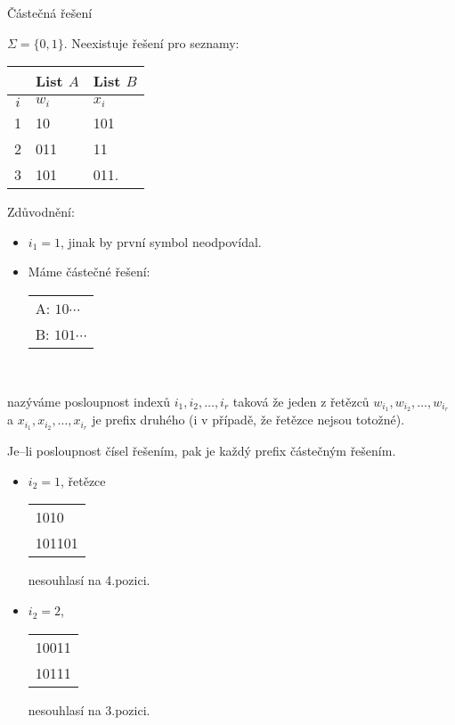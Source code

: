     \begin{frame}{Částečná řešení}
    \vskip-0.5cm
    \begin{minipage}{0.3\textwidth}
    \begin{example}
    $\Sigma=\{0,1\}$. Neexistuje řešení pro seznamy:
    \begin{tabular}{c | l | l}
     & List $A$ & List $B$\\
    \hline
    $i$ & $w_i$ & $x_i$ \\
    \hline
    1 & 10 & 101\\
    2 & 011 & 11\\
    3 & 101 & 011. 
    \end{tabular}
    \end{example}
    \pause
    Zdůvodnění:
    \begin{itemize}
        \item $i_{1}=1$, jinak by první symbol neodpovídal.
    \pause
        \item Máme částečné řešení:
    \begin{tabular}{ l}
    A: $10\cdots$\\
    B: $101\cdots$
    \end{tabular}
    \end{itemize}
    \end{minipage}
    \pause
    \begin{minipage}{0.01\textwidth}
    \ \end{minipage}
    \begin{minipage}{0.67\textwidth}
    \begin{definition}
     nazýváme posloupnost indexů ${i_1}, {i_2}, \ldots, {i_r}$ taková že jeden z řetězců $w_{i_1}, w_{i_2}, \ldots, w_{i_r}$ a $x_{i_1}, x_{i_2},\ldots, x_{i_r} $ je prefix druhého (i v případě, že řetězce nejsou totožné).
    \end{definition}
    \pause
    \begin{lemma}
    Je--li posloupnost čísel řešením, pak je každý prefix částečným řešením.
    \end{lemma}
    \pause
    \begin{minipage}{0.59\textwidth}
    \begin{itemize}[<+->]
        \item $i_{2}=1$, řetězce \begin{tabular}{l}1010\\101101\end{tabular} nesouhlasí na 4.pozici.
        \item $i_{2}=2$, \begin{tabular}{l}10011\\10111\end{tabular} nesouhlasí na 3.pozici.

\end{itemize}
\end{minipage}
\end{minipage}
\end{frame}
